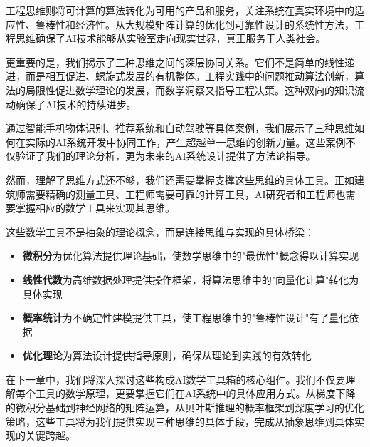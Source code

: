 工程思维则将可计算的算法转化为可用的产品和服务，关注系统在真实环境中的适应性、鲁棒性和经济性。从大规模矩阵计算的优化到可靠性设计的系统性方法，工程思维确保了AI技术能够从实验室走向现实世界，真正服务于人类社会。

更重要的是，我们揭示了三种思维之间的深层协同关系。它们不是简单的线性递进，而是相互促进、螺旋式发展的有机整体。工程实践中的问题推动算法创新，算法的局限性促进数学理论的发展，而数学洞察又指导工程决策。这种双向的知识流动确保了AI技术的持续进步。

通过智能手机物体识别、推荐系统和自动驾驶等具体案例，我们展示了三种思维如何在实际的AI系统开发中协同工作，产生超越单一思维的创新力量。这些案例不仅验证了我们的理论分析，更为未来的AI系统设计提供了方法论指导。

然而，理解了思维方式还不够，我们还需要掌握支撑这些思维的具体工具。正如建筑师需要精确的测量工具、工程师需要可靠的计算工具，AI研究者和工程师也需要掌握相应的数学工具来实现其思维。

这些数学工具不是抽象的理论概念，而是连接思维与实现的具体桥梁：
\begin{itemize}
\item \textbf{微积分}为优化算法提供理论基础，使数学思维中的"最优性"概念得以计算实现
\item \textbf{线性代数}为高维数据处理提供操作框架，将算法思维中的"向量化计算"转化为具体实现
\item \textbf{概率统计}为不确定性建模提供工具，使工程思维中的"鲁棒性设计"有了量化依据
\item \textbf{优化理论}为算法设计提供指导原则，确保从理论到实践的有效转化
\end{itemize}

在下一章中，我们将深入探讨这些构成AI数学工具箱的核心组件。我们不仅要理解每个工具的数学原理，更要掌握它们在AI系统中的具体应用方式。从梯度下降的微积分基础到神经网络的矩阵运算，从贝叶斯推理的概率框架到深度学习的优化策略，这些工具将为我们提供实现三种思维的具体手段，完成从抽象思维到具体实现的关键跨越。


